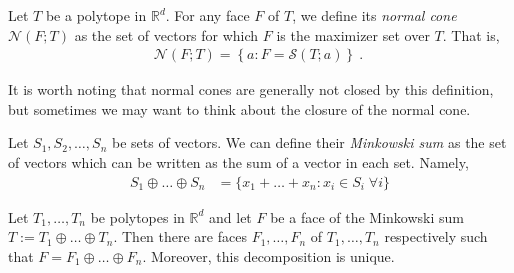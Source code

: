 \documentclass[final]{colt2020} %
\newcommand{\reals}{\mathbb{R}}
\newcommand{\N}{\mathcal{N}}
\begin{document}
\begin{definition}
	Let $T$ be a polytope in $\reals^d$.
	For any face $F$ of $T$, we define its \emph{normal cone} $\N(F;T)$ as the set of vectors for which $F$ is the maximizer set over $T$.
	That is,
	\begin{align*}
	\N(F;T) = \left\{a : F = \mathcal{S}(T; a) \right\}~.~
	\end{align*}
\end{definition}

It is worth noting that normal cones are generally not closed by this definition, but sometimes we may want to think about the closure of the normal cone.
\fi

\begin{definition}
	Let $S_1, S_2, \ldots, S_n$ be sets of vectors.
	We can define their \emph{Minkowski sum} as the set of vectors which can be written as the sum of a vector in each set.
	Namely,
	\begin{align*}
	S_1 \oplus \ldots \oplus S_n &= \{x_1 + \ldots + x_n : x_i \in S_i \; \forall i \}
	\end{align*}
\end{definition}

\begin{theorem} \label{thm:unique-face-decomp}
	Let $T_1, \ldots, T_n$ be polytopes in $\reals^d$ and let $F$ be a face of the Minkowski sum $T := T_1 \oplus \ldots \oplus T_n$.
	Then there are faces $F_1, \ldots, F_n$ of $T_1, \ldots, T_n$ respectively such that $F = F_1 \oplus \ldots \oplus F_n$.
	Moreover, this decomposition is unique.
\end{theorem}

\end{document}
